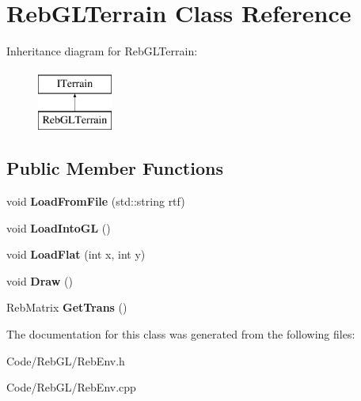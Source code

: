 \hypertarget{class_reb_g_l_terrain}{}\section{Reb\+G\+L\+Terrain Class Reference}
\label{class_reb_g_l_terrain}
Inheritance diagram for Reb\+G\+L\+Terrain\+:\begin{figure}[H]
\begin{center}
\leavevmode
\includegraphics[height=2.000000cm]{class_reb_g_l_terrain}
\end{center}
\end{figure}
\subsection*{Public Member Functions}
\begin{DoxyCompactItemize}
\item 
void {\bfseries Load\+From\+File} (std\+::string rtf)\hypertarget{class_reb_g_l_terrain_a4ff7f8605a3c594e73483d96a8d7aa06}{}\label{class_reb_g_l_terrain_a4ff7f8605a3c594e73483d96a8d7aa06}

\item 
void {\bfseries Load\+Into\+GL} ()\hypertarget{class_reb_g_l_terrain_aae729c31d0d1fea12df3c6134faebbb1}{}\label{class_reb_g_l_terrain_aae729c31d0d1fea12df3c6134faebbb1}

\item 
void {\bfseries Load\+Flat} (int x, int y)\hypertarget{class_reb_g_l_terrain_a038c0e89c5ba4f3ef9e94dfc1457521a}{}\label{class_reb_g_l_terrain_a038c0e89c5ba4f3ef9e94dfc1457521a}

\item 
void {\bfseries Draw} ()\hypertarget{class_reb_g_l_terrain_aafdc004c483da40c77c2e80cede60048}{}\label{class_reb_g_l_terrain_aafdc004c483da40c77c2e80cede60048}

\item 
Reb\+Matrix {\bfseries Get\+Trans} ()\hypertarget{class_reb_g_l_terrain_a91f2517ffb7e71ae50383781d21e056b}{}\label{class_reb_g_l_terrain_a91f2517ffb7e71ae50383781d21e056b}

\end{DoxyCompactItemize}


The documentation for this class was generated from the following files\+:\begin{DoxyCompactItemize}
\item 
Code/\+Reb\+G\+L/Reb\+Env.\+h\item 
Code/\+Reb\+G\+L/Reb\+Env.\+cpp\end{DoxyCompactItemize}
